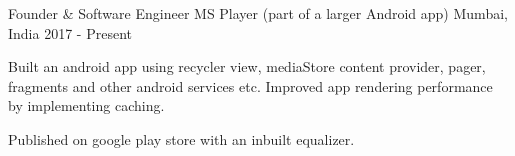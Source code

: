 \begin{cventries}

  \cventry
    {Founder \& Software Engineer} %
    {MS Player (part of a larger Android app)} %
    {Mumbai, India} %
    {2017 - Present} %
    {
      \begin{cvitems} %
        \item {Built an android app using recycler view, mediaStore content provider, pager, fragments and other android services etc. Improved app rendering performance by implementing caching. }
        \item {Published on google play store with an inbuilt equalizer. }
      \end{cvitems}
    }


\end{cventries}